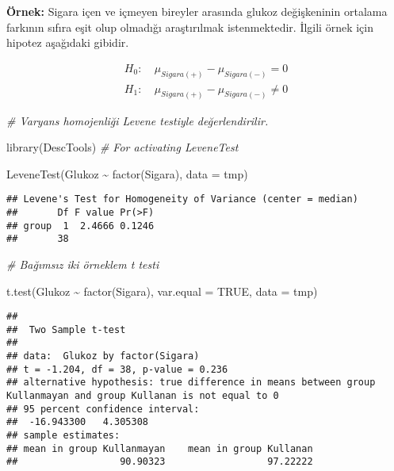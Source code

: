 \documentclass[
]{article}
\newenvironment{Shaded}{\begin{snugshade}}{\end{snugshade}}
\newcommand{\AttributeTok}[1]{\textcolor[rgb]{0.77,0.63,0.00}{#1}}
\newcommand{\CommentTok}[1]{\textcolor[rgb]{0.56,0.35,0.01}{\textit{#1}}}
\newcommand{\ConstantTok}[1]{\textcolor[rgb]{0.00,0.00,0.00}{#1}}
\newcommand{\FunctionTok}[1]{\textcolor[rgb]{0.00,0.00,0.00}{#1}}
\newcommand{\NormalTok}[1]{#1}
\newcommand{\SpecialCharTok}[1]{\textcolor[rgb]{0.00,0.00,0.00}{#1}}
\begin{document}
\textbf{Örnek:} Sigara içen ve içmeyen bireyler arasında glukoz
değişkeninin ortalama farkının sıfıra eşit olup olmadığı araştırılmak
istenmektedir. İlgili örnek için hipotez aşağıdaki gibidir.

\begin{align*}
  H_0:&~ \mu_{Sigara(+)} - \mu_{Sigara(-)} = 0 \\
  H_1:&~ \mu_{Sigara(+)} - \mu_{Sigara(-)} \neq 0
\end{align*}

\begin{Shaded}
\begin{Highlighting}[]
\CommentTok{\# Varyans homojenliği Levene testiyle değerlendirilir.}

\FunctionTok{library}\NormalTok{(DescTools) }\CommentTok{\# For activating LeveneTest}

\FunctionTok{LeveneTest}\NormalTok{(Glukoz }\SpecialCharTok{\textasciitilde{}} \FunctionTok{factor}\NormalTok{(Sigara), }\AttributeTok{data =}\NormalTok{ tmp)}
\end{Highlighting}
\end{Shaded}

\begin{verbatim}
## Levene's Test for Homogeneity of Variance (center = median)
##       Df F value Pr(>F)
## group  1  2.4666 0.1246
##       38
\end{verbatim}

\begin{Shaded}
\begin{Highlighting}[]
\CommentTok{\# Bağımsız iki örneklem t testi}

  \FunctionTok{t.test}\NormalTok{(Glukoz }\SpecialCharTok{\textasciitilde{}} \FunctionTok{factor}\NormalTok{(Sigara), }\AttributeTok{var.equal =} \ConstantTok{TRUE}\NormalTok{, }\AttributeTok{data =}\NormalTok{ tmp)}
\end{Highlighting}
\end{Shaded}

\begin{verbatim}
## 
##  Two Sample t-test
## 
## data:  Glukoz by factor(Sigara)
## t = -1.204, df = 38, p-value = 0.236
## alternative hypothesis: true difference in means between group Kullanmayan and group Kullanan is not equal to 0
## 95 percent confidence interval:
##  -16.943300   4.305308
## sample estimates:
## mean in group Kullanmayan    mean in group Kullanan 
##                  90.90323                  97.22222
\end{verbatim}
\end{document}
